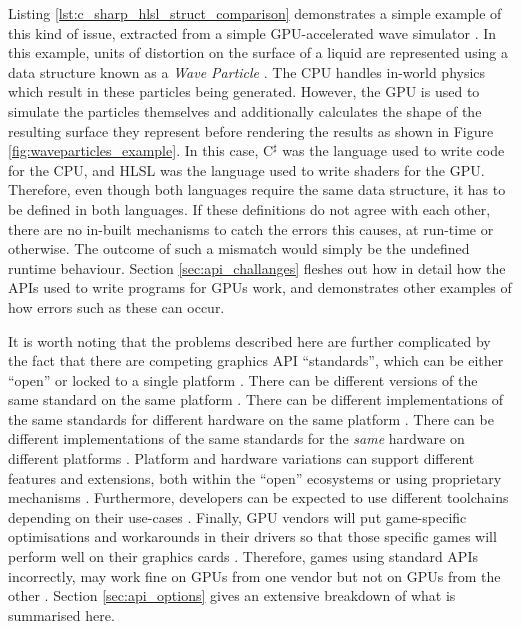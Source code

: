 \documentclass[a4paper,12pt,twoside,openright]{report}
\begin{document}
Listing \ref{lst:c_sharp_hlsl_struct_comparison} demonstrates a simple example
of this kind of issue, extracted from a simple GPU-accelerated wave simulator
\cite{WaveParticlesGPU}. In this example, units of distortion on the surface of
a liquid are represented using a data structure known as a \textit{Wave
Particle} \cite{WaveParticlesOriginalPaper}. The CPU handles in-world physics
which result in these particles being generated. However, the GPU is used to
simulate the particles themselves and additionally calculates the shape of the
resulting surface they represent before rendering the results as shown in
Figure \ref{fig:waveparticles_example}. In this case, C$^\sharp$ was the
language used to write code for the CPU, and HLSL was the language used to
write shaders for the GPU. Therefore, even though both languages require the
same data structure, it has to be defined in both languages. If these
definitions do not agree with each other, there are no in-built mechanisms to
catch the errors this causes, at run-time or otherwise. The outcome of such a
mismatch would simply be the undefined runtime behaviour. Section
\ref{sec:api_challanges} fleshes out how in detail how the APIs used to write
programs for GPUs work, and demonstrates other examples of how errors such as
these can occur.

It is worth noting that the problems described here are further complicated by
the fact that there are competing graphics API ``standards'', which can be
either ``open'' \cite{OpenGL} \cite{Vulkan} or locked to a single platform
\cite{Direct3D} \cite{Metal}. There can be different versions of the same
standard on the same platform \cite{OpenGLHistory}. There can be different
implementations of the same standards for different hardware on the same
platform \cite{NVIDIADrivers} \cite{NVIDIADrivers}. There can be different
implementations of the same standards for the \textit{same} hardware on
different platforms \cite{OpenGLGettingStarted}. Platform and hardware
variations can support different features and extensions, both within the
``open'' ecosystems \cite{VulkanExtensions} or using proprietary mechanisms
\cite{PhysXSDK} \cite{HairworksAMD}. Furthermore, developers can be expected to
use different toolchains depending on their use-cases
\cite{KhronosDeveloperOverview}. Finally, GPU vendors will put game-specific
optimisations and workarounds in their drivers so that those specific games
will perform well on their graphics cards \cite{WhyGamesAreWorseOnLinux}.
Therefore, games using standard APIs incorrectly, may work fine on GPUs from
one vendor but not on GPUs from the other \cite{TODO}. Section
\ref{sec:api_options} gives an extensive breakdown of what is summarised here.
\end{document}
